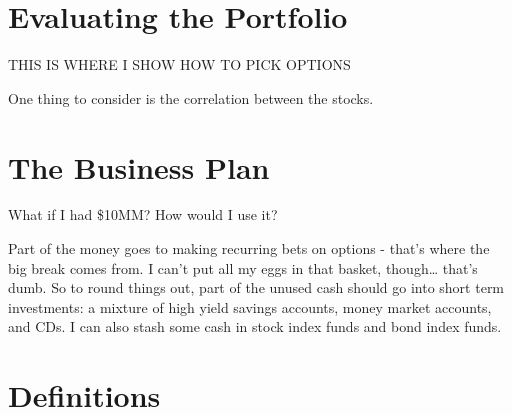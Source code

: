 \documentclass[
]{book}
\begin{document}
\hypertarget{evaluating-the-portfolio}{%
\chapter{Evaluating the Portfolio}\label{evaluating-the-portfolio}}

THIS IS WHERE I SHOW HOW TO PICK OPTIONS

One thing to consider is the correlation between the stocks.

\hypertarget{the-business-plan}{%
\chapter{The Business Plan}\label{the-business-plan}}

What if I had \$10MM? How would I use it?

Part of the money goes to making recurring bets on options - that's where the
big break comes from. I can't put all my eggs in that basket, though\ldots{} that's
dumb. So to round things out, part of the unused cash should go into short
term investments: a mixture of high yield savings accounts, money market
accounts, and CDs. I can also stash some cash in stock index funds and bond
index funds.

\hypertarget{appendix-appendix}{%
\appendix}


\hypertarget{def}{%
\chapter{Definitions}\label{def}}
\end{document}
